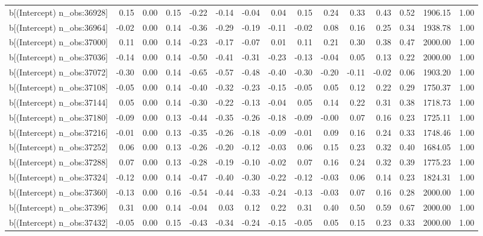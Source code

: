 \begin{table}[ht]
\begin{tabular}{rrrrrrrrrrrrrrr}
  b[(Intercept) n\_obs:36928] & 0.15 & 0.00 & 0.15 & -0.22 & -0.14 & -0.04 & 0.04 & 0.15 & 0.24 & 0.33 & 0.43 & 0.52 & 1906.15 & 1.00 \\ 
  b[(Intercept) n\_obs:36964] & -0.02 & 0.00 & 0.14 & -0.36 & -0.29 & -0.19 & -0.11 & -0.02 & 0.08 & 0.16 & 0.25 & 0.34 & 1938.78 & 1.00 \\ 
  b[(Intercept) n\_obs:37000] & 0.11 & 0.00 & 0.14 & -0.23 & -0.17 & -0.07 & 0.01 & 0.11 & 0.21 & 0.30 & 0.38 & 0.47 & 2000.00 & 1.00 \\ 
  b[(Intercept) n\_obs:37036] & -0.14 & 0.00 & 0.14 & -0.50 & -0.41 & -0.31 & -0.23 & -0.13 & -0.04 & 0.05 & 0.13 & 0.22 & 2000.00 & 1.00 \\ 
  b[(Intercept) n\_obs:37072] & -0.30 & 0.00 & 0.14 & -0.65 & -0.57 & -0.48 & -0.40 & -0.30 & -0.20 & -0.11 & -0.02 & 0.06 & 1903.20 & 1.00 \\ 
  b[(Intercept) n\_obs:37108] & -0.05 & 0.00 & 0.14 & -0.40 & -0.32 & -0.23 & -0.15 & -0.05 & 0.05 & 0.12 & 0.22 & 0.29 & 1750.37 & 1.00 \\ 
  b[(Intercept) n\_obs:37144] & 0.05 & 0.00 & 0.14 & -0.30 & -0.22 & -0.13 & -0.04 & 0.05 & 0.14 & 0.22 & 0.31 & 0.38 & 1718.73 & 1.00 \\ 
  b[(Intercept) n\_obs:37180] & -0.09 & 0.00 & 0.13 & -0.44 & -0.35 & -0.26 & -0.18 & -0.09 & -0.00 & 0.07 & 0.16 & 0.23 & 1725.11 & 1.00 \\ 
  b[(Intercept) n\_obs:37216] & -0.01 & 0.00 & 0.13 & -0.35 & -0.26 & -0.18 & -0.09 & -0.01 & 0.09 & 0.16 & 0.24 & 0.33 & 1748.46 & 1.00 \\ 
  b[(Intercept) n\_obs:37252] & 0.06 & 0.00 & 0.13 & -0.26 & -0.20 & -0.12 & -0.03 & 0.06 & 0.15 & 0.23 & 0.32 & 0.40 & 1684.05 & 1.00 \\ 
  b[(Intercept) n\_obs:37288] & 0.07 & 0.00 & 0.13 & -0.28 & -0.19 & -0.10 & -0.02 & 0.07 & 0.16 & 0.24 & 0.32 & 0.39 & 1775.23 & 1.00 \\ 
  b[(Intercept) n\_obs:37324] & -0.12 & 0.00 & 0.14 & -0.47 & -0.40 & -0.30 & -0.22 & -0.12 & -0.03 & 0.06 & 0.14 & 0.23 & 1824.31 & 1.00 \\ 
  b[(Intercept) n\_obs:37360] & -0.13 & 0.00 & 0.16 & -0.54 & -0.44 & -0.33 & -0.24 & -0.13 & -0.03 & 0.07 & 0.16 & 0.28 & 2000.00 & 1.00 \\ 
  b[(Intercept) n\_obs:37396] & 0.31 & 0.00 & 0.14 & -0.04 & 0.03 & 0.12 & 0.22 & 0.31 & 0.40 & 0.50 & 0.59 & 0.67 & 2000.00 & 1.00 \\ 
  b[(Intercept) n\_obs:37432] & -0.05 & 0.00 & 0.15 & -0.43 & -0.34 & -0.24 & -0.15 & -0.05 & 0.05 & 0.15 & 0.23 & 0.33 & 2000.00 & 1.00 \\ 

\end{tabular}
\end{table}
